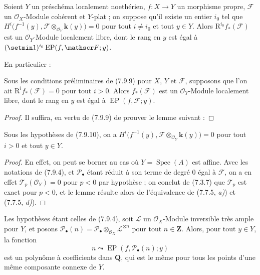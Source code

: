 \begin{corollary}[7.9.9]
\label{III.7.9.9.fr}
Soient $Y$ un préschéma localement noethérien, $f:X\to Y$ un morphisme propre,
$\mathscr F$ un $\mathscr O_X$-Module cohérent et $Y$-plat ; on suppose qu'il
existe un entier $i_0$ tel que
$H^i\bigl(f^{-1}(y),\mathscr F\otimes_{\mathscr O_Y}\boldsymbol{k}(y)\bigr)=0$ pour tout $i\ne i_0$ et tout $y\in Y$.
Alors $\mathrm R^{i_0}f_*(\mathscr F)$ est un $\mathscr O_Y$-Module localement
libre, dont le rang en $y$ est égal à
$(\setmin 1)^{i_0}\operatorname{EP}(f,\mathscr F;y)$.
\end{corollary}

En particulier :

\begin{corollary}[7.9.10]
\label{III.7.9.10.fr}
Sous les conditions préliminaires de \textup{(7.9.9)} pour $X$, $Y$ et $\mathscr F$,
supposons que l'on ait $\mathrm R^if_*(\mathscr F)=0$ pour tout $i>0$. Alors
$f_*(\mathscr F)$ est un $\mathscr O_Y$-Module localement libre, dont le rang en
$y$ est égal à $\operatorname{EP}(f,\mathscr F;y)$.
\end{corollary}

\begin{proof}
Il suffira, en vertu de (7.9.9) de prouver le lemme suivant :
\end{proof}

\begin{lemma}[7.9.10.1]
\label{III.7.9.10.1.fr}
Sous les hypothèses de \textup{(7.9.10)}, on a $H^i\bigl(f^{-1}(y),\mathscr F\otimes_{\mathscr O_Y}\boldsymbol{k}(y)\bigr)=0$
pour tout $i>0$ et tout $y\in Y$.
\end{lemma}

\begin{proof}
En effet, on peut se borner au cas où $Y=\operatorname{Spec}(A)$ est affine.
Avec les notations de (7.9.4), et $\mathscr P_\bullet$ étant réduit à son terme
de degré $0$ égal à $\mathscr F$, on a en effet
$\mathscr T_p(\mathscr O_Y)=0$ pour $p<0$ par hypothèse ; on conclut de (7.3.7)
que $\mathscr T_p$ est exact pour $p<0$, et le lemme résulte alors de
l'équivalence de (7.7.5, \emph{a)}) et (7.7.5, \emph{d)}).
\end{proof}

\begin{proposition}[7.9.11]
\label{III.7.9.11.fr}
Les hypothèses étant celles de \textup{(7.9.4)}, soit $\mathscr L$ un
$\mathscr O_X$-Module inversible très ample pour $Y$, et posons
$\mathscr P_\bullet(n)=\mathscr P_\bullet\otimes_{\mathscr O_X}
\mathscr L^{\otimes n}$ pour tout $n\in\mathbf Z$. Alors, pour tout $y\in Y$,
la fonction
\[
  n\leadsto\operatorname{EP}(f,\mathscr P_\bullet(n);y)
  \tag{7.9.11.1}\label{III.7.9.11.1.fr}
\]
est un polynôme à coefficients dans $\mathbf Q$, qui est le même pour tous les
points d'une même composante connexe de $Y$.
\end{proposition}

